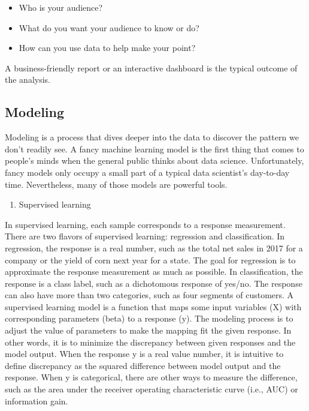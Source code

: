\documentclass[12pt,]{krantz}
\providecommand{\tightlist}{%
  \setlength{\itemsep}{0pt}\setlength{\parskip}{0pt}}
\begin{document}
\begin{itemize}
\tightlist
\item
  Who is your audience?
\item
  What do you want your audience to know or do?
\item
  How can you use data to help make your point?
\end{itemize}

A business-friendly report or an interactive dashboard is the typical outcome of the analysis.

\hypertarget{modeling}{%
\subsection{Modeling}\label{modeling}}

Modeling is a process that dives deeper into the data to discover the pattern we don't readily see. A fancy machine learning model is the first thing that comes to people's minds when the general public thinks about data science. Unfortunately, fancy models only occupy a small part of a typical data scientist's day-to-day time. Nevertheless, many of those models are powerful tools.

\begin{enumerate}
\def\labelenumi{(\arabic{enumi})}
\tightlist
\item
  Supervised learning
\end{enumerate}

In supervised learning, each sample corresponds to a response measurement. There are two flavors of supervised learning: regression and classification. In regression, the response is a real number, such as the total net sales in 2017 for a company or the yield of corn next year for a state. The goal for regression is to approximate the response measurement as much as possible. In classification, the response is a class label, such as a dichotomous response of yes/no. The response can also have more than two categories, such as four segments of customers. A supervised learning model is a function that maps some input variables (X) with corresponding parameters (beta) to a response (y). The modeling process is to adjust the value of parameters to make the mapping fit the given response. In other words, it is to minimize the discrepancy between given responses and the model output. When the response y is a real value number, it is intuitive to define discrepancy as the squared difference between model output and the response. When y is categorical, there are other ways to measure the difference, such as the area under the receiver operating characteristic curve (i.e., AUC) or information gain.
\end{document}
